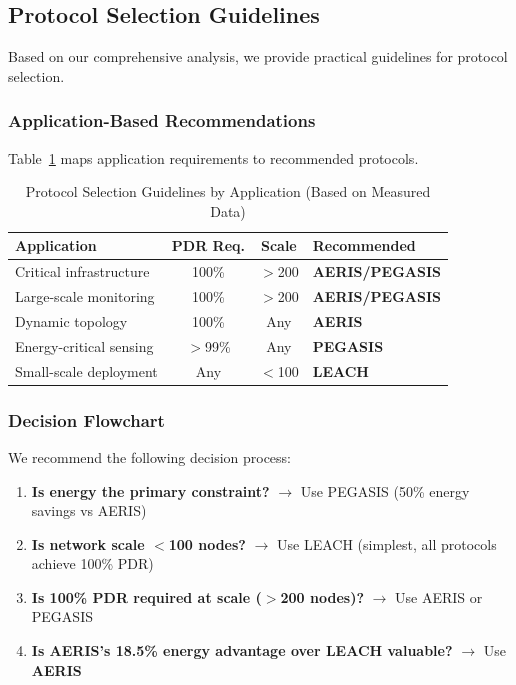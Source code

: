 \subsection{Protocol Selection Guidelines}

Based on our comprehensive analysis, we provide practical guidelines
for protocol selection.

\subsubsection{Application-Based Recommendations}

Table~\ref{tab:recommendations} maps application requirements to
recommended protocols.

\begin{table}[htbp]
\centering
\caption{Protocol Selection Guidelines by Application (Based on Measured Data)}
\label{tab:recommendations}
\begin{tabular}{@{}p{3.5cm}ccp{3cm}@{}}
\toprule
Application & PDR Req. & Scale & Recommended \\
\midrule
Critical infrastructure & 100\% & $>$200 & \textbf{AERIS/PEGASIS} \\
Large-scale monitoring & 100\% & $>$200 & \textbf{AERIS/PEGASIS} \\
Dynamic topology & 100\% & Any & \textbf{AERIS} \\
Energy-critical sensing & $>$99\% & Any & \textbf{PEGASIS} \\
Small-scale deployment & Any & $<$100 & \textbf{LEACH} \\
\bottomrule
\end{tabular}
\end{table}

\subsubsection{Decision Flowchart}

We recommend the following decision process:

\begin{enumerate}
    \item \textbf{Is energy the primary constraint?} $\rightarrow$ Use PEGASIS
    (50\% energy savings vs AERIS)

    \item \textbf{Is network scale $<$100 nodes?} $\rightarrow$ Use LEACH
    (simplest, all protocols achieve 100\% PDR)

    \item \textbf{Is 100\% PDR required at scale ($>$200 nodes)?} $\rightarrow$
    Use AERIS or PEGASIS

    \item \textbf{Is AERIS's 18.5\% energy advantage over LEACH valuable?}
    $\rightarrow$ Use \textbf{AERIS}
\end{enumerate}

